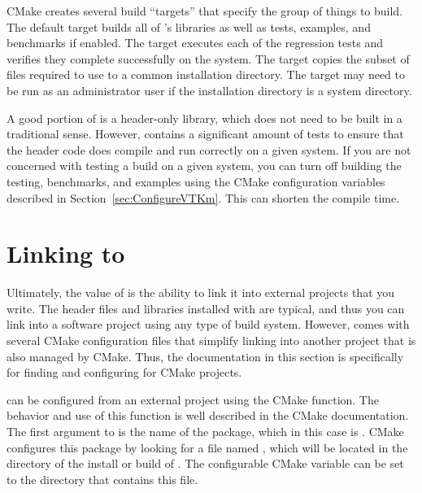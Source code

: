 CMake creates several build ``targets'' that specify the group of things to build.
The default target builds all of \VTKm's libraries as well as tests, examples, and benchmarks if enabled.
The  target executes each of the \VTKm regression tests and verifies they complete successfully on the system.
The  target copies the subset of files required to use \VTKm to a common installation directory.
The  target may need to be run as an administrator user if the installation directory is a system directory.

\begin{didyouknow}
  A good portion of \VTKm is a header-only library, which does not need to be built in a traditional sense.
  However, \VTKm contains a significant amount of tests to ensure that the header code does compile and run correctly on a given system.
  If you are not concerned with testing a build on a given system, you can turn off building the testing, benchmarks, and examples using the CMake configuration variables described in Section~\ref{sec:ConfigureVTKm}.
  This can shorten the \VTKm compile time.
\end{didyouknow}


\section{Linking to \VTKm}

Ultimately, the value of \VTKm is the ability to link it into external projects that you write.
The header files and libraries installed with \VTKm are typical, and thus you can link \VTKm into a software project using any type of build system.
However, \VTKm comes with several CMake configuration files that simplify linking \VTKm into another project that is also managed by CMake.
Thus, the documentation in this section is specifically for finding and configuring \VTKm for CMake projects.


\VTKm can be configured from an external project using the  CMake function.
The behavior and use of this function is well described in the CMake documentation.
The first argument to  is the name of the package, which in this case is .
CMake configures this package by looking for a file named , which will be located in the  directory of the install or build of \VTKm.
The configurable CMake variable  can be set to the directory that contains this file.

